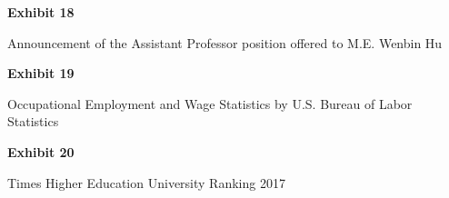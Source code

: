 \documentclass{article}
\begin{document}
% 

\vspace*{\fill}
\begin{center}

{\LARGE \bf
Exhibit 18
}

\vspace{10\baselineskip}

{\large Announcement of the Assistant Professor position offered to M.E. Wenbin Hu}

\end{center}
\vspace*{\fill}

% 


\vspace*{\fill}
\begin{center}

{\LARGE \bf
Exhibit 19
}

\vspace{10\baselineskip}

{\large Occupational Employment and Wage Statistics by U.S. Bureau of Labor Statistics}

\end{center}
\vspace*{\fill}

% 

% 

% 

% 




\vspace*{\fill}
\begin{center}
{\LARGE \bf
Exhibit 20
}

\vspace{10\baselineskip}

{\large Times Higher Education University Ranking 2017}

\end{center}
\vspace*{\fill}
\end{document}
